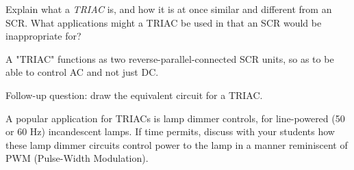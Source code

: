 

Explain what a {\it TRIAC} is, and how it is at once similar and different from an SCR.  What applications might a TRIAC be used in that an SCR would be inappropriate for?







A "TRIAC" functions as two reverse-parallel-connected SCR units, so as to be able to control AC and not just DC.

\vskip 10pt

Follow-up question: draw the equivalent circuit for a TRIAC.







A popular application for TRIACs is lamp dimmer controls, for line-powered (50 or 60 Hz) incandescent lamps.  If time permits, discuss with your students how these lamp dimmer circuits control power to the lamp in a manner reminiscent of PWM (Pulse-Width Modulation).




